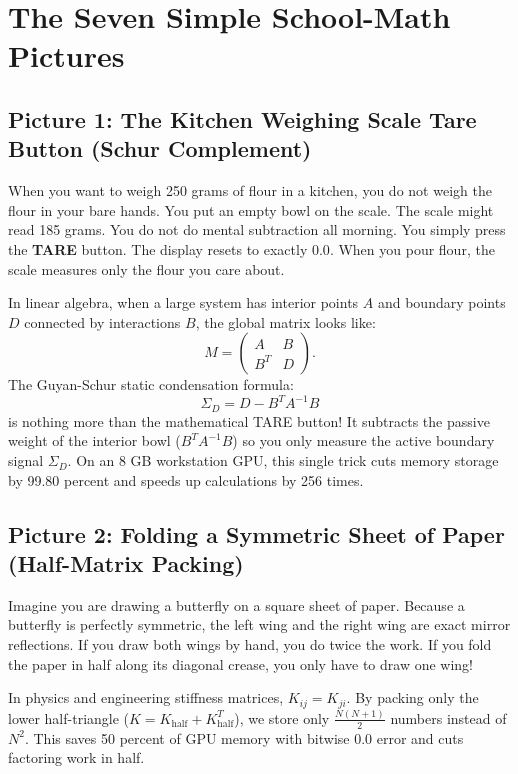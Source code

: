 \documentclass[11pt,a4paper]{article}
\begin{document}
\section{The Seven Simple School-Math Pictures}

\subsection{Picture 1: The Kitchen Weighing Scale Tare Button (Schur Complement)}
When you want to weigh 250 grams of flour in a kitchen, you do not weigh the flour in your bare hands. You put an empty bowl on the scale. The scale might read 185 grams. You do not do mental subtraction all morning. You simply press the \textbf{TARE} button. The display resets to exactly $0.0$. When you pour flour, the scale measures only the flour you care about.

In linear algebra, when a large system has interior points $A$ and boundary points $D$ connected by interactions $B$, the global matrix looks like:
\begin{equation}
M = \begin{pmatrix} A & B \\ B^T & D \end{pmatrix}.
\end{equation}
The Guyan-Schur static condensation formula:
\begin{equation}
\Sigma_D = D - B^T A^{-1} B
\end{equation}
is nothing more than the mathematical TARE button! It subtracts the passive weight of the interior bowl ($B^T A^{-1} B$) so you only measure the active boundary signal $\Sigma_D$. On an 8 GB workstation GPU, this single trick cuts memory storage by 99.80 percent and speeds up calculations by 256 times.

\subsection{Picture 2: Folding a Symmetric Sheet of Paper (Half-Matrix Packing)}
Imagine you are drawing a butterfly on a square sheet of paper. Because a butterfly is perfectly symmetric, the left wing and the right wing are exact mirror reflections. If you draw both wings by hand, you do twice the work. If you fold the paper in half along its diagonal crease, you only have to draw one wing!

In physics and engineering stiffness matrices, $K_{ij} = K_{ji}$. By packing only the lower half-triangle ($K = K_{\mathrm{half}} + K_{\mathrm{half}}^T$), we store only $\frac{N(N+1)}{2}$ numbers instead of $N^2$. This saves 50 percent of GPU memory with bitwise 0.0 error and cuts factoring work in half.
\end{document}
